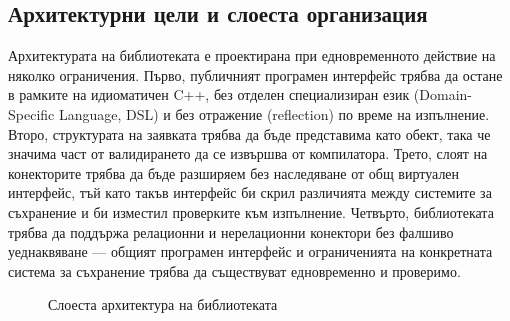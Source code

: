 \subsection{Архитектурни цели и слоеста организация}
\label{subsec:architecture_goals}

Архитектурата на библиотеката е проектирана при едновременното действие на няколко ограничения. Първо, публичният програмен интерфейс трябва да остане в рамките на идиоматичен C++, без отделен специализиран език (Domain-Specific Language, DSL) и без отражение (reflection) по време на изпълнение. Второ, структурата на заявката трябва да бъде представима като  обект, така че значима част от валидирането да се извършва от компилатора. Трето, слоят на конекторите трябва да бъде разширяем без наследяване от общ виртуален интерфейс, тъй като такъв интерфейс би скрил различията между системите за съхранение и би изместил проверките към изпълнение. Четвърто, библиотеката трябва да поддържа релационни и нерелационни конектори без фалшиво уеднаквяване --- общият програмен интерфейс и ограниченията на конкретната система за съхранение трябва да съществуват едновременно и проверимо.

\begin{figure}[H]
\centering
{}
\caption{Слоеста архитектура на библиотеката}
\label{fig:architecture_layers}
\end{figure}

